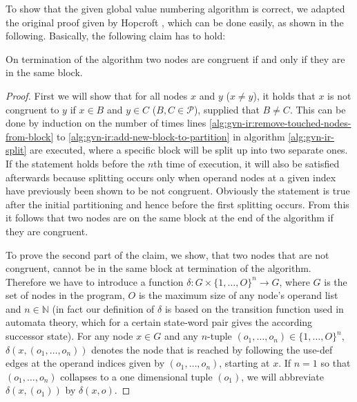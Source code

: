 To show that the given global value numbering algorithm is correct, we adapted the original proof given by Hopcroft \cite{hopcroft:1971:an-n-log-n-algorithm}, which can be done easily, as shown in the following. Basically, the following claim has to hold:

\begin{claim}
On termination of the algorithm two nodes are congruent if and only if they are in the same block.
\end{claim}

\begin{proof}
First we will show that for all nodes $x$ and $y$ ($x \neq y$), it holds that $x$ is not congruent to $y$ if $x \in B$ and $y \in C$ ($B, C \in \mathcal{P}$), supplied that $B \neq C$.
This can be done by induction on the number of times lines \ref{alg:gvn-ir:remove-touched-nodes-from-block} to \ref{alg:gvn-ir:add-new-block-to-partition} in algorithm \ref{alg:gvn-ir-split} are executed, where a specific block will be split up into two separate ones. If the statement holds before the $n$th time of execution, it will also be satisfied afterwards because splitting occurs only when operand nodes at a given index have previously been shown to be not congruent. Obviously the statement is true after the initial partitioning and hence before the first splitting occurs. From this it follows that two nodes are on the same block at the end of the algorithm if they are congruent.

To prove the second part of the claim, we show, that two nodes that are not congruent, cannot be in the same block at termination of the algorithm. Therefore we have to introduce a function $\delta : G \times \lbrace 1,\ldots , O\rbrace ^n \rightarrow G$, where $G$ is the set of nodes in the program, $O$ is the maximum size of any node's operand list and $n \in \mathbb{N}$ (in fact our definition of $\delta$ is based on the transition function used in automata theory, which for a certain state-word pair gives the according successor state). For any node $x \in G$ and any $n$-tuple $(o_1,\ldots , o_n) \in \lbrace 1,\ldots , O\rbrace ^n$, $\delta (x, (o_1,\ldots , o_n))$ denotes the node that is reached by following the use-def edges at the operand indices given by $(o_1,\ldots , o_n)$, starting at $x$. If $n = 1$ so that $(o_1,\ldots , o_n)$ collapses to a one dimensional tuple $(o_1)$, we will abbreviate $\delta (x, (o_1))$ by $\delta (x, o)$.


\end{proof}
